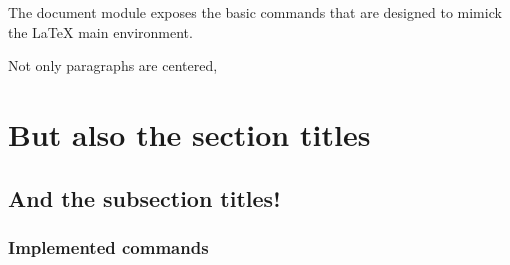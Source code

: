 The document module exposes the basic commands that are designed to mimick the LaTeX main environment.

\begin{center}
    Not only paragraphs are centered, 
    \section{But also the section titles}
    \subsection{And the subsection titles!}
\end{center}

\subsubsection{Implemented commands}
